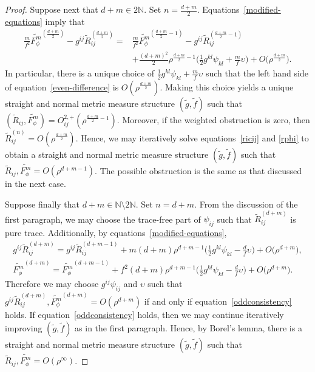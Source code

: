 \documentclass[pdftex]{sigma}
\numberwithin{equation}{section}
\begin{document}
\begin{proof}
Suppose next that $d+m\in 2\mathbb{N}$. Set $n=\frac{d+m}{2}$. Equations~\eqref{modified-equations} imply that
\begin{align}
\frac{m}{f^2}\widetilde{F_{\phi}^m}^{(\frac{d+m}{2})}- g^{ij}\widetilde{R}_{ij}^{(\frac{d+m}{2})} ={}&\frac{m}{f^2}\widetilde{F_{\phi}^m}^{(\frac{d+m}{2}-1)}-g^{ij}\widetilde{R}_{ij}^{(\frac{d+m}{2}-1)} \nonumber
\\
&+\frac{(d+m)^2}{2}\rho^{\frac{d+m}{2}-1} \bigg(\frac{1}{2}g^{kl}\psi_{kl}+\frac{m}{f}\upsilon\bigg)+O\big(\rho^{\frac{d+m}{2}}\big).
\label{even-difference}
\end{align}
In particular, there is a unique choice of $\frac{1}{2}g^{kl}\psi_{kl}+\frac{m}{f}\upsilon$ such that the left hand side of equation~\eqref{even-difference} is $O(\rho^{\frac{d+m}{2}})$. Making this choice yields a unique straight and normal metric measure structure $(\widetilde{g},\widetilde{f})$ such that $(\widetilde{R}_{ij},\widetilde{F_\phi^m})=O_{ij}^{2,+}(\rho^{\frac{d+m}{2}-1})$.
Moreover, if the weighted obstruction is zero, then $\widetilde{R}_{ij}^{(n)}=O(\rho^{\frac{d+m}{2}})$. Hence, we may iteratively solve equations~\eqref{ricij} and \eqref{rphi} to obtain a straight and normal metric measure structure $(\widetilde{g},\widetilde{f})$ such that $\widetilde{R}_{ij},\widetilde{F_\phi^m}=O(\rho^{d+m-1})$. The possible obstruction is the same as that discussed in the next case.

Suppose finally that $d+m\in \mathbb{N}\setminus 2\mathbb{N}$. Set $n=d+m$. From the discussion of the first paragraph, we may choose the trace-free part of $\psi_{ij}$ such that $\widetilde{R}_{ij}^{(d+m)}$ is pure trace. Additionally, by equations~\eqref{modified-equations},
\begin{gather*}
g^{ij}\widetilde{R}_{ij}^{(d+m)}=g^{ij}\widetilde{R}_{ij}^{(d+m-1)}+
m(d+m) \rho^{d+m-1}\bigg(\frac{1}{2}g^{kl}\psi_{kl}-\frac{d}{f}\upsilon\bigg)+O\big(\rho^{d+m}\big),
\\
\widetilde{F_{\phi}^m}^{(d+m)}= \widetilde{F_{\phi}^m}^{(d+m-1)}
+f^2(d+m)\rho^{d+m-1} \bigg(\frac{1}{2}g^{kl}\psi_{kl}-\frac{d}{f}\upsilon\bigg)+O\big(\rho^{d+m}\big).
\end{gather*}
Therefore we may choose $g^{ij}\psi_{ij}$ and $\upsilon$ such that $g^{ij}\widetilde{R}_{ij}^{(d+m)},\widetilde{F_{\phi}^m}^{(d+m)}=O(\rho^{d+m})$ if and only if
equation~\eqref{oddconsistency} holds. If equation~\eqref{oddconsistency} holds, then we may continue iteratively improving $(\widetilde{g},\widetilde{f})$ as in the first paragraph. Hence, by Borel's lemma, there is a straight and normal metric measure structure $(\widetilde{g},\widetilde{f})$ such that $\widetilde{R}_{ij},\widetilde{F_\phi^m}=O(\rho^\infty)$.
\end{proof}
\end{document}
